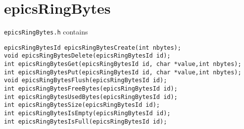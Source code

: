 \section{epicsRingBytes}

\verb|epicsRingBytes.h| contains

\begin{verbatim}
epicsRingBytesId epicsRingBytesCreate(int nbytes);
void epicsRingBytesDelete(epicsRingBytesId id);
int epicsRingBytesGet(epicsRingBytesId id, char *value,int nbytes);
int epicsRingBytesPut(epicsRingBytesId id, char *value,int nbytes);
void epicsRingBytesFlush(epicsRingBytesId id);
int epicsRingBytesFreeBytes(epicsRingBytesId id);
int epicsRingBytesUsedBytes(epicsRingBytesId id);
int epicsRingBytesSize(epicsRingBytesId id);
int epicsRingBytesIsEmpty(epicsRingBytesId id);
int epicsRingBytesIsFull(epicsRingBytesId id);
\end{verbatim}

